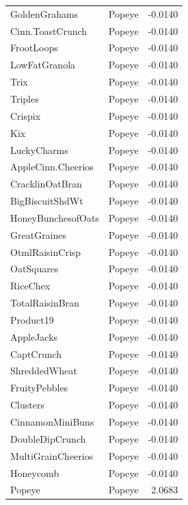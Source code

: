 \begin{longtable}{llr}
GoldenGrahams & Popeye & -0.0140 \\
Cinn.ToastCrunch & Popeye & -0.0140 \\
FrootLoops & Popeye & -0.0140 \\
LowFatGranola & Popeye & -0.0140 \\
Trix & Popeye & -0.0140 \\
Triples & Popeye & -0.0140 \\
Crispix & Popeye & -0.0140 \\
Kix & Popeye & -0.0140 \\
LuckyCharms & Popeye & -0.0140 \\
AppleCinn.Cheerios & Popeye & -0.0140 \\
CracklinOatBran & Popeye & -0.0140 \\
BigBiscuitShdWt & Popeye & -0.0140 \\
HoneyBunchesofOats & Popeye & -0.0140 \\
GreatGraines & Popeye & -0.0140 \\
OtmlRaisinCrisp & Popeye & -0.0140 \\
OatSquares & Popeye & -0.0140 \\
RiceChex & Popeye & -0.0140 \\
TotalRaisinBran & Popeye & -0.0140 \\
Product19 & Popeye & -0.0140 \\
AppleJacks & Popeye & -0.0140 \\
CaptCrunch & Popeye & -0.0140 \\
ShreddedWheat & Popeye & -0.0140 \\
FruityPebbles & Popeye & -0.0140 \\
Clusters & Popeye & -0.0140 \\
CinnamonMiniBuns & Popeye & -0.0140 \\
DoubleDipCrunch & Popeye & -0.0140 \\
MultiGrainCheerios & Popeye & -0.0140 \\
Honeycomb & Popeye & -0.0140 \\
Popeye & Popeye & 2.0683 \\
\end{longtable}
